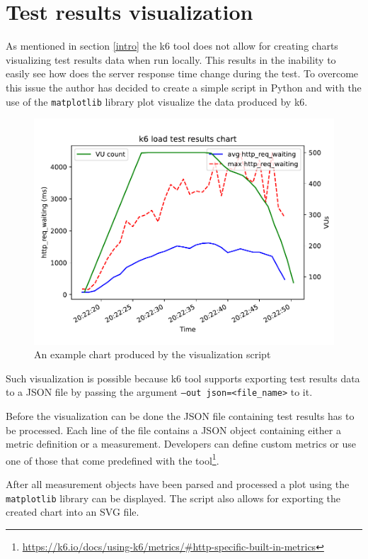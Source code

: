 \documentclass[12pt, a4paper]{article}
\let\oldsection\section
\renewcommand\section{\clearpage\oldsection}
\begin{document}
\section{Test results visualization}

As mentioned in section \ref{intro} the k6 tool does not allow for creating charts visualizing test results data when run locally.
This results in the inability to easily see how does the server response time change during the test.
To overcome this issue the author has decided to create a simple script in Python and with the use of the \texttt{matplotlib} library plot visualize the data produced by k6.

\begin{figure}[!ht]
    \centering 
    \includegraphics[width=1\textwidth]{pdf/visualizer-example.pdf}
    \caption{An example chart produced by the visualization script}
\end{figure}

Such visualization is possible because k6 tool supports exporting test results data to a JSON file by passing the argument \texttt{--out json=<file\_name>} to it.

Before the visualization can be done the JSON file containing test results has to be processed.
Each line of the file contains a JSON object containing either a metric definition or a measurement.
Developers can define custom metrics or use one of those that come predefined with the tool\footnote{\url{https://k6.io/docs/using-k6/metrics/#http-specific-built-in-metrics}}.

After all measurement objects have been parsed and processed a plot using the \texttt{matplotlib} library can be displayed.
The script also allows for exporting the created chart into an SVG file.
\end{document}
